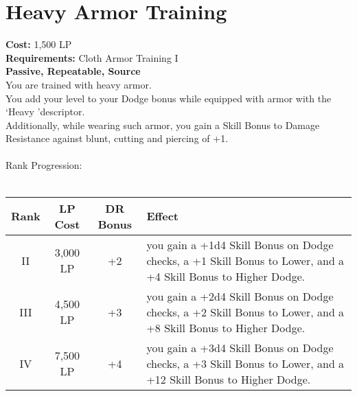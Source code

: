 \section{Heavy Armor Training}\label{perk:heavyArmorTraining}
\textbf{Cost:} 1,500 LP\\
\textbf{Requirements:} Cloth Armor Training I\\
\textbf{Passive, Repeatable, Source}\\
You are trained with heavy armor.\\
You add your level to your Dodge bonus while equipped with armor with the \lq Heavy \rq descriptor.\\
Additionally, while wearing such armor, you gain a Skill Bonus to Damage Resistance against blunt, cutting and piercing of +1.\\
\\

Rank Progression:\\
\\
\begin{longtable}{c | c | c | p{6cm}}
    Rank & LP Cost & DR Bonus & Effect \\
    \hline
    II
    & 3,000 LP
    & +2
    & you gain a +1d4 Skill Bonus on Dodge checks, a +1 Skill Bonus to Lower, and a +4 Skill Bonus to Higher Dodge.
    \\
    III
    & 4,500 LP
    & +3
    & you gain a +2d4 Skill Bonus on Dodge checks, a +2 Skill Bonus to Lower, and a +8 Skill Bonus to Higher Dodge.
    \\
    IV
    & 7,500 LP
    & +4
    & you gain a +3d4 Skill Bonus on Dodge checks, a +3 Skill Bonus to Lower, and a +12 Skill Bonus to Higher Dodge.
    \\
\end{longtable}